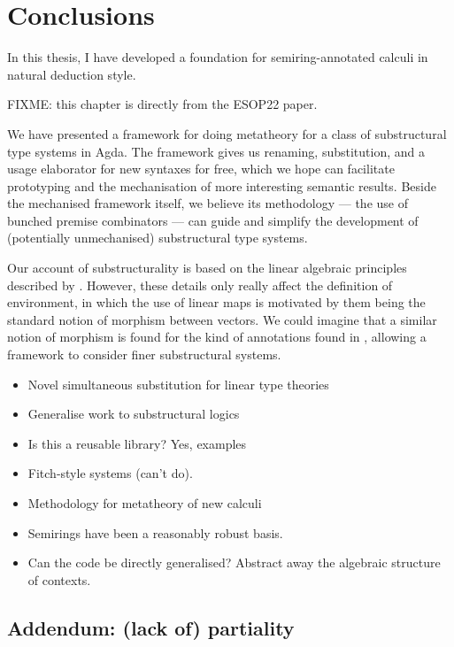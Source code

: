 \chapter{Conclusions}\label{sec:conc}

In this thesis, I have developed a foundation for semiring-annotated calculi in
natural deduction style.

FIXME: this chapter is directly from the ESOP22 paper.

We have presented a framework for doing metatheory for a class of substructural
type systems in Agda.
The framework gives us renaming, substitution, and a usage elaborator for new
syntaxes for free, which we hope can facilitate prototyping and the
mechanisation of more interesting semantic results.
Beside the mechanised framework itself, we believe its methodology --- the use
of bunched premise combinators --- can guide and simplify the development of
(potentially unmechanised) substructural type systems.

Our account of substructurality is based on the linear algebraic
principles described by \citet{WA21}.
However, these details only really affect the definition of environment,
in which the use of linear maps is motivated by them being the standard notion
of morphism between vectors.
We could imagine that a similar notion of morphism is found for the kind of
annotations found in \citet{LicataSR17}, allowing a framework to consider
finer substructural systems.

\begin{itemize}
  \item Novel simultaneous substitution for linear type theories
  \item Generalise \citet{AACMM21} work to substructural logics
  \item Is this a reusable library? Yes, examples
  \item Fitch-style systems (can't do).
  \item Methodology for metatheory of new calculi
  \item Semirings have been a reasonably robust basis.
  \item Can the code be directly generalised?
    Abstract away the algebraic structure of contexts.
\end{itemize}

\section{Addendum: (lack of) partiality}\label{sec:part}

